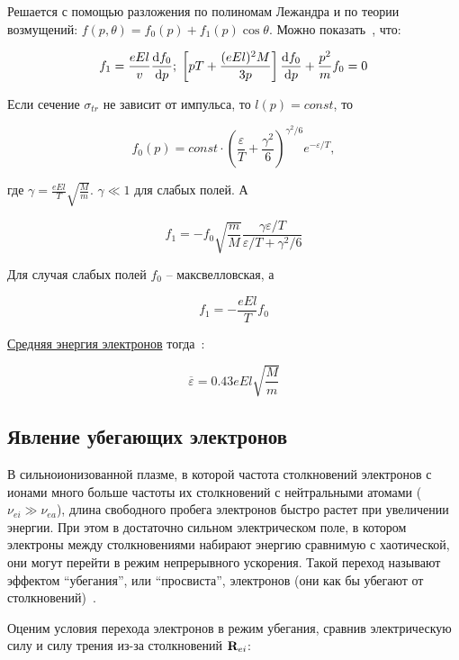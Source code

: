 \documentclass[10pt, a4paper]{article}
\begin{document}
Решается с помощью разложения по полиномам Лежандра и по теории возмущений: $f(p, \theta) = f_0(p)+f_1(p)\cos\theta$. Можно показать~\cite{landau10}, что:

\begin{equation*}
	f_1 = \frac{eEl}{v}\dv{f_0}{p};\;\left[pT + \frac{(eEl)^2M}{3p}\right]\dv{f_0}{p}+\frac{p^2}{m}f_0 = 0
\end{equation*}

Если сечение $\sigma_{tr}$ не зависит от импульса, то $l(p)=const$, то

\begin{equation*}
	f_0(p) = const\cdot\left(\frac{\varepsilon}{T}+\frac{\gamma^2}{6}\right)^{\gamma^2/6}e^{-\varepsilon/T},
\end{equation*}

где $\gamma = \frac{eEl}{T}\sqrt{\frac{M}{m}}$. $\gamma\ll1$ для слабых полей. А

\begin{equation*}
	f_1 = -f_0\sqrt{\frac{m}{M}} \frac{\gamma\varepsilon/T}{\varepsilon/T+\gamma^2/6}
\end{equation*}

Для случая слабых полей $f_0$ -- максвелловская, а 

\begin{equation*}
	f_1 = -\frac{eEl}{T}f_0
\end{equation*}

\uline{Средняя энергия электронов} тогда~\cite{landau10}:

\begin{equation*}
	\overline{\varepsilon}=0.43eEl\sqrt{\frac{M}{m}}
\end{equation*}

\subsection{Явление убегающих электронов}

В сильноионизованной плазме, в которой частота столкновений электронов с ионами много больше частоты их столкновений с нейтральными атомами ($\nu_{ei}\gg\nu_{ea}$), длина свободного пробега электронов быстро растет при увеличении энергии. При этом в достаточно сильном электрическом поле, в котором электроны между столкновениями набирают энергию сравнимую с хаотической, они могут перейти в режим непрерывного ускорения. Такой переход называют эффектом ``убегания'', или ``просвиста'', электронов (они как бы убегают от столкновений)~\cite{golant}.

Оценим условия перехода электронов в режим убегания, сравнив электрическую силу и силу трения из-за столкновений $\vb{R}_{ei}$:
\end{document}

